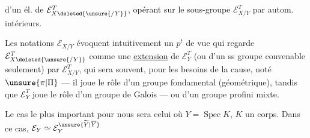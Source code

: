 
d'un él. de $\mathcal E_{X\deleted{\unsure{/Y}}}^T$, opérant
sur le sous-groupe $\mathcal E_{X/Y}^T$ par autom.
intérieurs.

Les notations  $\mathcal E_{X/Y}$ évoquent
intuitivement un $p^t$ de vue qui
regarde $\mathcal E_{X\deleted{\unsure{/Y}}}^T$ comme une \uline{extension}
de $\mathcal E_Y^T$ (ou d'un ss groupe
convenable seulement) par $\mathcal E_{X/Y}^T$,
qui sera souvent, pour les besoins de
la cause, noté $\unsure{\pi|\Pi}$ --- il joue le
rôle d'un groupe fondamental
(géométrique), tandis que $\mathcal E_Y^T$ joue
le rôle d'un groupe de Galois ---
ou d'un groupe profini mixte.


Le cas le plus important pour nous
sera celui où $Y=\operatorname{Spec}K$, $K$ un corps.
 Dans ce cas, $\mathcal E_Y\simeq\mathcal E_Y^{\unsure{\widetilde Y|\overline Y}}$

